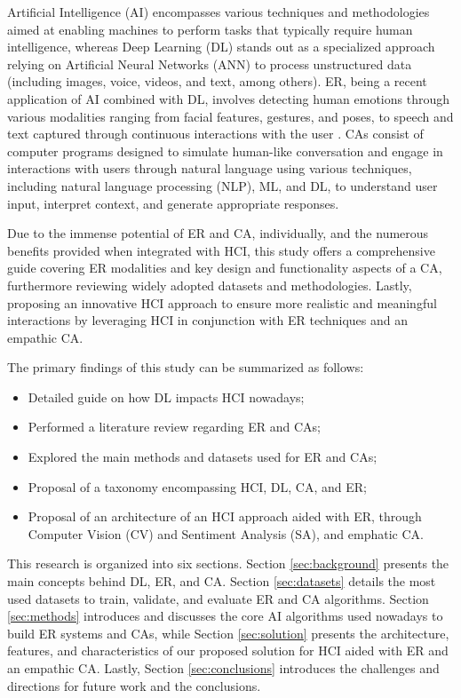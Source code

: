\documentclass[runningheads]{llncs}
\begin{document}
Artificial Intelligence (AI) encompasses various techniques and methodologies aimed at enabling machines to perform tasks that typically require human intelligence, whereas Deep Learning (DL) stands out as a specialized approach relying on Artificial Neural Networks (ANN) to process unstructured data (including images, voice, videos, and text, among others). ER, being a recent application of AI combined with DL, involves detecting human emotions through various modalities ranging from facial features, gestures, and poses, to speech and text captured through continuous interactions with the user \cite{alrowais_modified_2023}.  CAs consist of computer programs designed to simulate human-like conversation and engage in interactions with users through natural language using various techniques, including natural language processing (NLP), ML, and DL, to understand user input, interpret context, and generate appropriate responses.
 
Due to the immense potential of ER and CA, individually, and the numerous benefits provided when integrated with HCI, this study offers a comprehensive guide covering ER modalities and key design and functionality aspects of a CA, furthermore reviewing widely adopted datasets and methodologies. Lastly, proposing an innovative HCI approach to ensure more realistic and meaningful interactions by leveraging HCI in conjunction with ER techniques and an empathic CA.
 
The primary findings of this study can be summarized as follows:
\begin{itemize}
	\item Detailed guide on how DL impacts HCI nowadays;
	\item Performed a literature review regarding ER and CAs;
	\item Explored the main methods and datasets used for ER and CAs;
	\item Proposal of a taxonomy encompassing HCI, DL, CA, and ER;
	\item Proposal of an architecture of an HCI approach aided with ER, through Computer Vision (CV) and Sentiment Analysis (SA), and emphatic CA.
\end{itemize}

This research is organized into six sections. Section \ref{sec:background} presents the main concepts behind DL, ER, and CA. Section \ref{sec:datasets} details the most used datasets to train, validate, and evaluate ER and CA algorithms. Section \ref{sec:methods} introduces and discusses the core AI algorithms used nowadays to build ER systems and CAs, while Section \ref{sec:solution} presents the architecture, features, and characteristics of our proposed solution for HCI aided with ER and an empathic CA. Lastly, Section \ref{sec:conclusions}  introduces the challenges and directions for future work and the conclusions. 
\end{document}

